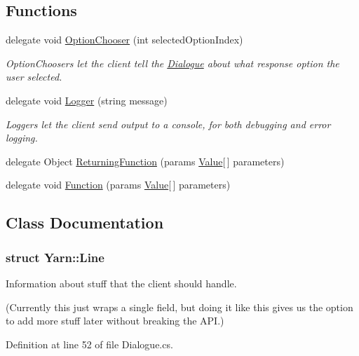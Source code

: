 \subsection*{Functions}
\begin{DoxyCompactItemize}
\item 
delegate void \hyperlink{a00041_a39866cbb03c03a35805d598b5d4ad553}{Option\-Chooser} (int selected\-Option\-Index)
\begin{DoxyCompactList}\small\item\em Option\-Choosers let the client tell the \hyperlink{a00082}{Dialogue} about what response option the user selected. \end{DoxyCompactList}\item 
delegate void \hyperlink{a00041_a1e50031b945a3a2afafee6f590730568}{Logger} (string message)
\begin{DoxyCompactList}\small\item\em Loggers let the client send output to a console, for both debugging and error logging. \end{DoxyCompactList}\item 
delegate Object \hyperlink{a00041_a5177bf74fbfe7303fac9d8236c2e514b}{Returning\-Function} (params \hyperlink{a00177}{Value}\mbox{[}$\,$\mbox{]} parameters)
\item 
delegate void \hyperlink{a00041_ae0be2e5cf13d5779816102439e61ff1a}{Function} (params \hyperlink{a00177}{Value}\mbox{[}$\,$\mbox{]} parameters)
\end{DoxyCompactItemize}


\subsection{Class Documentation}
\label{a00359}
\hypertarget{a00041_a00359}{}
\subsubsection{struct Yarn\-:\-:Line}
Information about stuff that the client should handle. 

(Currently this just wraps a single field, but doing it like this gives us the option to add more stuff later without breaking the A\-P\-I.) 

Definition at line 52 of file Dialogue.\-cs.




